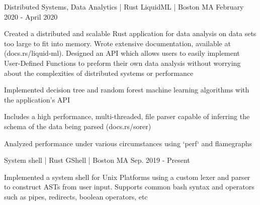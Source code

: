 

\begin{cventries}
    \cventry
    {Distributed Systems, Data Analytics | Rust} %
    {LiquidML | \href{https://github.com/goodSyntax808/liquid-ml}{\faGithub}} %
    {Boston MA} %
    {February 2020 - April 2020} %
    {
      \begin{cvitems} %
        \item {Created a distributed and scalable Rust application for data analysis on data sets too large to fit into memory. Wrote extensive documentation, available at (docs.rs/liquid-ml). Designed an API which allows users to easily implement User-Defined Functions to preform their own data analysis without worrying about the complexities of distributed systems or performance}
        \item {Implemented decision tree and random forest machine learning algorithms with the application's API}
        \item {Includes a high performance, multi-threaded, file parser capable of inferring the schema of the data being parsed (docs.rs/sorer)}
        \item {Analyzed performance under various circumstances using `perf` and flamegraphs}
      \end{cvitems}
    }

    \cventry
    {System shell | Rust} %
    {GShell | \href{https://github.com/goodSyntax808/gshell}{\faGithub}} %
    {Boston MA} %
    {Sep. 2019 - Present} %
    {
      \begin{cvitems} %
        \item {Implemented a system shell for Unix Platforms using a custom lexer and parser to construct ASTs from user input. Supports common bash syntax and operators such as pipes, redirects, boolean operators, etc}
      \end{cvitems}
    }

\end{cventries}
